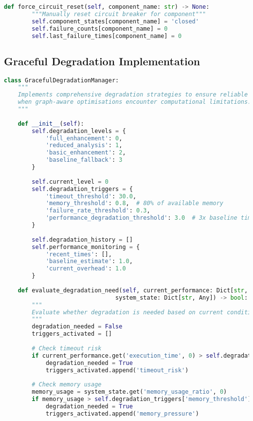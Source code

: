 \begin{lstlisting}[language=Python, caption=Circuit Breaker Pattern for Reliable Operation]
    def force_circuit_reset(self, component_name: str) -> None:
        """Manually reset circuit breaker for component"""
        self.component_states[component_name] = 'closed'
        self.failure_counts[component_name] = 0
        self.last_failure_times[component_name] = 0
\end{lstlisting}

\subsection{Graceful Degradation Implementation}
\label{appendix:graceful-degradation}

\begin{lstlisting}[language=Python, caption=Graceful Degradation for Worst-Case Scenarios]
class GracefulDegradationManager:
    """
    Implements comprehensive degradation strategies to ensure reliable operation 
    when graph-aware optimisations encounter computational limitations.
    """
    
    def __init__(self):
        self.degradation_levels = {
            'full_enhancement': 0,
            'reduced_analysis': 1, 
            'basic_enhancement': 2,
            'baseline_fallback': 3
        }
        
        self.current_level = 0
        self.degradation_triggers = {
            'timeout_threshold': 30.0,
            'memory_threshold': 0.8,  # 80% of available memory
            'failure_rate_threshold': 0.3,
            'performance_degradation_threshold': 3.0  # 3x baseline time
        }
        
        self.degradation_history = []
        self.performance_monitoring = {
            'recent_times': [],
            'baseline_estimate': 1.0,
            'current_overhead': 1.0
        }
    
    def evaluate_degradation_need(self, current_performance: Dict[str, Any],
                                system_state: Dict[str, Any]) -> bool:
        """
        Evaluate whether degradation is needed based on current conditions.
        """
        degradation_needed = False
        triggers_activated = []
        
        # Check timeout risk
        if current_performance.get('execution_time', 0) > self.degradation_triggers['timeout_threshold']:
            degradation_needed = True
            triggers_activated.append('timeout_risk')
        
        # Check memory usage
        memory_usage = system_state.get('memory_usage_ratio', 0)
        if memory_usage > self.degradation_triggers['memory_threshold']:
            degradation_needed = True
            triggers_activated.append('memory_pressure')
        

\end{lstlisting}
